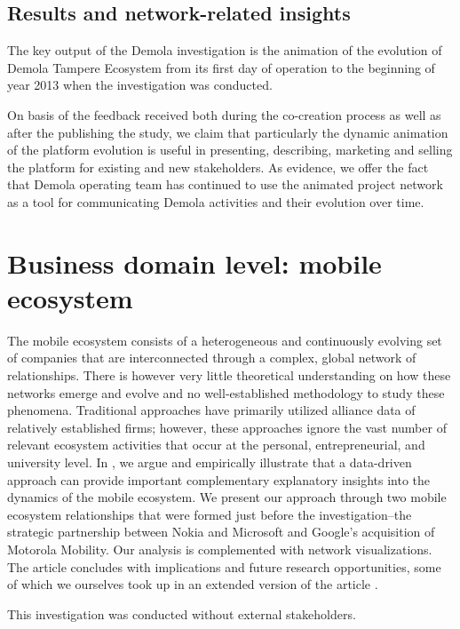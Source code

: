 \subsection{Results and network-related insights}

The key output of the Demola investigation is the animation of the evolution of Demola Tampere Ecosystem from its first day of operation to the beginning of year 2013 when the investigation was conducted.

On basis of the feedback received both during the co-creation process as well as after the publishing the study, we claim that particularly the dynamic animation of the platform evolution is useful in presenting, describing, marketing and selling the platform for existing and new stakeholders. As evidence, we offer the fact that Demola operating team has continued to use the animated project network as a tool for communicating Demola activities and their evolution over time.

\section{Business domain level: mobile ecosystem}

The mobile ecosystem consists of a heterogeneous and continuously evolving set of companies that are interconnected through a complex, global network of relationships. There is however very little theoretical understanding on how these networks emerge and evolve and no well-established methodology to study these phenomena. Traditional approaches have primarily utilized alliance data of relatively established firms; however, these approaches ignore the vast number of relevant ecosystem activities that occur at the personal, entrepreneurial, and university level. In \cite{Basole2012UnderstandingApproach}, we argue and empirically illustrate that a data-driven approach can provide important complementary explanatory insights into the dynamics of the mobile ecosystem. We present our approach through two mobile ecosystem relationships that were formed just before the investigation--the strategic partnership between Nokia and Microsoft and Google’s acquisition of Motorola Mobility. Our analysis is complemented with network visualizations. The article concludes with implications and future research opportunities, some of which we ourselves took up in an extended version of the article \citep{Basole2015UnderstandingApproach}. 

This investigation was conducted without external stakeholders.

